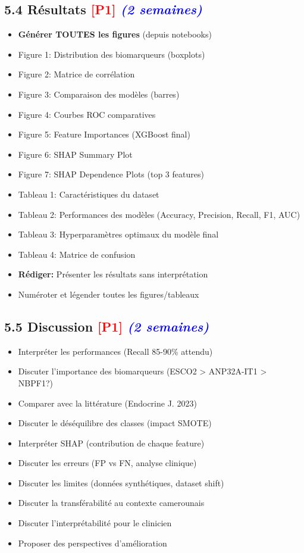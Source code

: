 \documentclass[a4paper,11pt]{article}
\newcommand{\checkbox}{\large$\square$}
\newcommand{\priorite}[1]{\textcolor{red}{\textbf{[#1]}}}
\newcommand{\duree}[1]{\textcolor{blue}{\textit{(#1)}}}
\begin{document}
\subsection*{5.4 Résultats \priorite{P1} \duree{2 semaines}}

\begin{itemize}[label=\checkbox]
    \item \textbf{Générer TOUTES les figures} (depuis notebooks)
    \item Figure 1: Distribution des biomarqueurs (boxplots)
    \item Figure 2: Matrice de corrélation
    \item Figure 3: Comparaison des modèles (barres)
    \item Figure 4: Courbes ROC comparatives
    \item Figure 5: Feature Importances (XGBoost final)
    \item Figure 6: SHAP Summary Plot
    \item Figure 7: SHAP Dependence Plots (top 3 features)
    \item Tableau 1: Caractéristiques du dataset
    \item Tableau 2: Performances des modèles (Accuracy, Precision, Recall, F1, AUC)
    \item Tableau 3: Hyperparamètres optimaux du modèle final
    \item Tableau 4: Matrice de confusion
    \item \textbf{Rédiger:} Présenter les résultats sans interprétation
    \item Numéroter et légender toutes les figures/tableaux
\end{itemize}

\subsection*{5.5 Discussion \priorite{P1} \duree{2 semaines}}

\begin{itemize}[label=\checkbox]
    \item Interpréter les performances (Recall 85-90\% attendu)
    \item Discuter l'importance des biomarqueurs (ESCO2 > ANP32A-IT1 > NBPF1?)
    \item Comparer avec la littérature (Endocrine J. 2023)
    \item Discuter le déséquilibre des classes (impact SMOTE)
    \item Interpréter SHAP (contribution de chaque feature)
    \item Discuter les erreurs (FP vs FN, analyse clinique)
    \item Discuter les limites (données synthétiques, dataset shift)
    \item Discuter la transférabilité au contexte camerounais
    \item Discuter l'interprétabilité pour le clinicien
    \item Proposer des perspectives d'amélioration
\end{itemize}
\end{document}
